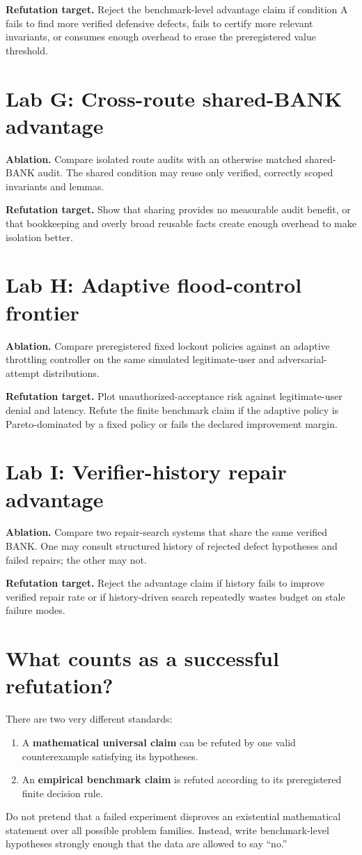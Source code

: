 \documentclass[11pt,openany]{book}
\theoremstyle{definition}
\theoremstyle{remark}
\begin{document}
\textbf{Refutation target.} Reject the benchmark-level advantage claim if condition A fails to find more verified defensive defects, fails to certify more relevant invariants, or consumes enough overhead to erase the preregistered value threshold.

\section{Lab G: Cross-route shared-BANK advantage}
\textbf{Ablation.} Compare isolated route audits with an otherwise matched shared-BANK audit. The shared condition may reuse only verified, correctly scoped invariants and lemmas.

\textbf{Refutation target.} Show that sharing provides no measurable audit benefit, or that bookkeeping and overly broad reusable facts create enough overhead to make isolation better.

\section{Lab H: Adaptive flood-control frontier}
\textbf{Ablation.} Compare preregistered fixed lockout policies against an adaptive throttling controller on the same simulated legitimate-user and adversarial-attempt distributions.

\textbf{Refutation target.} Plot unauthorized-acceptance risk against legitimate-user denial and latency. Refute the finite benchmark claim if the adaptive policy is Pareto-dominated by a fixed policy or fails the declared improvement margin.

\section{Lab I: Verifier-history repair advantage}
\textbf{Ablation.} Compare two repair-search systems that share the same verified BANK. One may consult structured history of rejected defect hypotheses and failed repairs; the other may not.

\textbf{Refutation target.} Reject the advantage claim if history fails to improve verified repair rate or if history-driven search repeatedly wastes budget on stale failure modes.

\section{What counts as a successful refutation?}
There are two very different standards:
\begin{enumerate}
\item A \textbf{mathematical universal claim} can be refuted by one valid counterexample satisfying its hypotheses.
\item An \textbf{empirical benchmark claim} is refuted according to its preregistered finite decision rule.
\end{enumerate}
Do not pretend that a failed experiment disproves an existential mathematical statement over all possible problem families. Instead, write benchmark-level hypotheses strongly enough that the data are allowed to say ``no.''
\end{document}
